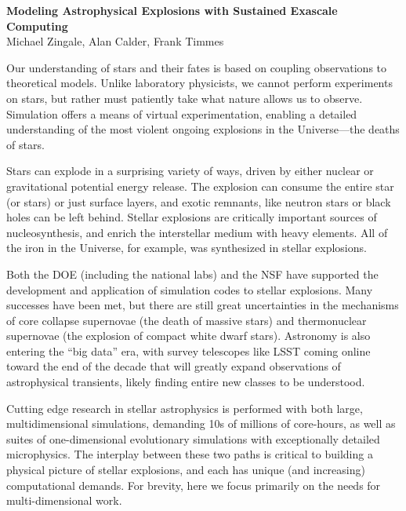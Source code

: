\documentclass[11pt,twocolumn]{article}
\begin{document}
\thispagestyle{plain}

\begin{center}
{\sffamily \bfseries Modeling Astrophysical Explosions with Sustained 
                     Exascale Computing\footnotemark[1]} \\
{\sffamily\small
Michael Zingale\footnotemark[2], 
Alan Calder\footnotemark[2], 
Frank Timmes\footnotemark[3]
}
\end{center}
%

Our understanding of stars and their fates is based on coupling
observations to theoretical models.  Unlike laboratory physicists, we
cannot perform experiments on stars, but rather must
patiently take what nature allows us to observe.  Simulation offers a means
of virtual experimentation, enabling a detailed understanding of the
most violent ongoing explosions in the Universe---the deaths of stars.

Stars can explode in a surprising variety of ways, driven by either
nuclear or gravitational potential energy release.  The
explosion can consume the entire star (or stars) or just
surface layers, and exotic remnants, like neutron stars or black holes
can be left behind.  Stellar explosions are critically important sources of
nucleosynthesis, and enrich the interstellar medium with heavy elements.
All of the iron in the Universe, for example, was synthesized in
stellar explosions.

Both the DOE (including the national labs) and the
NSF have supported the development and application of simulation codes
to stellar explosions.  Many successes have been met, but there are
still great uncertainties in the mechanisms of core collapse
supernovae (the death of massive stars) and thermonuclear supernovae
(the explosion of compact white dwarf stars).  Astronomy is also
entering the ``big data'' era, with survey telescopes
like LSST coming online toward the end of the decade that will greatly
expand observations of astrophysical transients, likely finding entire
new classes to be understood.

Cutting edge research in stellar astrophysics is performed with both
large, multidimensional simulations, demanding 10s of millions of
core-hours, as well as suites of one-dimensional evolutionary
simulations with exceptionally detailed microphysics.  The interplay
between these two paths is critical to building a physical picture
of stellar explosions, and each has unique (and increasing)
computational demands.  For brevity, here we focus primarily on the
needs for multi-dimensional work.
\end{document}
